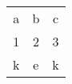\begin{center}\begin{tabular}{|c|c|c|}\hline
a & b & c \\ 
1 & 2 & 3 \\ 
k & e & k\\ 
\hline\end{tabular}\end{center}